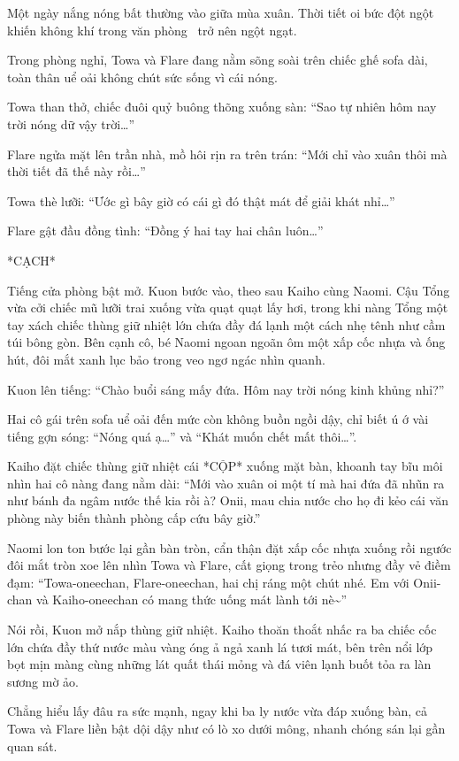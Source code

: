 \documentclass[../main.tex]{subfiles}
\begin{document}
Một ngày nắng nóng bất thường vào giữa mùa xuân. Thời tiết oi bức đột ngột khiến không khí trong văn phòng \hll\ trở nên ngột ngạt.

Trong phòng nghỉ, Towa và Flare đang nằm sõng soài trên chiếc ghế sofa dài, toàn thân uể oải không chút sức sống vì cái nóng.

Towa than thở, chiếc đuôi quỷ buông thõng xuống sàn: ``Sao tự nhiên hôm nay trời nóng dữ vậy trời\dots''

Flare ngửa mặt lên trần nhà, mồ hôi rịn ra trên trán: ``Mới chỉ vào xuân thôi mà thời tiết đã thế này rồi\dots''

Towa thè lưỡi: ``Ước gì bây giờ có cái gì đó thật mát để giải khát nhỉ\dots''

Flare gật đầu đồng tình: ``Đồng ý hai tay hai chân luôn\dots''

*CẠCH*

Tiếng cửa phòng bật mở. Kuon bước vào, theo sau Kaiho cùng Naomi. Cậu Tổng vừa cởi chiếc mũ lưỡi trai xuống vừa quạt quạt lấy hơi, trong khi nàng Tổng một tay xách chiếc thùng giữ nhiệt lớn chứa đầy đá lạnh một cách nhẹ tênh như cầm túi bông gòn. Bên cạnh cô, bé Naomi ngoan ngoãn ôm một xấp cốc nhựa và ống hút, đôi mắt xanh lục bảo trong veo ngơ ngác nhìn quanh.

Kuon lên tiếng: ``Chào buổi sáng mấy đứa. Hôm nay trời nóng kinh khủng nhỉ?''

Hai cô gái trên sofa uể oải đến mức còn không buồn ngồi dậy, chỉ biết ú ớ vài tiếng gợn sóng: ``Nóng quá ạ\dots'' và ``Khát muốn chết mất thôi\dots''.

Kaiho đặt chiếc thùng giữ nhiệt cái *CỘP* xuống mặt bàn, khoanh tay bĩu môi nhìn hai cô nàng đang nằm dài: ``Mới vào xuân oi một tí mà hai đứa đã nhũn ra như bánh đa ngâm nước thế kia rồi à? Onii, mau chia nước cho họ đi kẻo cái văn phòng này biến thành phòng cấp cứu bây giờ.''

Naomi lon ton bước lại gần bàn tròn, cẩn thận đặt xấp cốc nhựa xuống rồi ngước đôi mắt tròn xoe lên nhìn Towa và Flare, cất giọng trong trẻo nhưng đầy vẻ điềm đạm: ``Towa-oneechan, Flare-oneechan, hai chị ráng một chút nhé. Em với Onii-chan và Kaiho-oneechan có mang thức uống mát lành tới nè\~{}''

Nói rồi, Kuon mở nắp thùng giữ nhiệt. Kaiho thoăn thoắt nhấc ra ba chiếc cốc lớn chứa đầy thứ nước màu vàng óng ả ngả xanh lá tươi mát, bên trên nổi lớp bọt mịn màng cùng những lát quất thái mỏng và đá viên lạnh buốt tỏa ra làn sương mờ ảo.

Chẳng hiểu lấy đâu ra sức mạnh, ngay khi ba ly nước vừa đáp xuống bàn, cả Towa và Flare liền bật dội dậy như có lò xo dưới mông, nhanh chóng sán lại gần quan sát.
\end{document}
